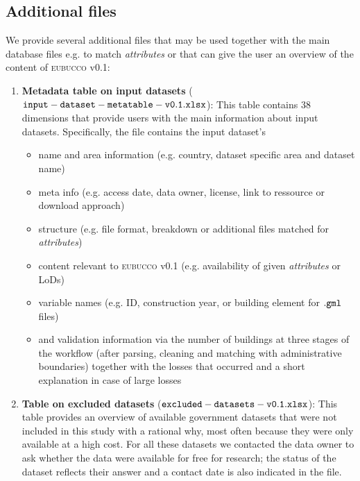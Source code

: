 \documentclass[fleqn,10pt]{wlscirep}
\begin{document}
\subsection*{Additional files}
We provide several additional files that may be used together with the main database files e.g. to match \textit{attributes} or that can give the user an overview of the content of \textsc{eubucco} v0.1: 


\begin{enumerate}[topsep=1pt]

     \itemsep-0.05em 
    
    \item \textbf{Metadata table on input datasets} (${\tt input-dataset-metatable-v0.1.xlsx}$): This table contains 38 dimensions that provide users with the main information about input datasets. Specifically, the file contains the input dataset's
    
    \begin{itemize}[topsep=1pt]
        \itemsep-0.05em  
        \item name and area information (e.g. country, dataset specific area and dataset name)
        \item meta info (e.g. access date, data owner, license, link to ressource or download approach)
        \item structure (e.g. file format, breakdown or additional files matched for \textit{attributes})
        \item content relevant to \textsc{eubucco} v0.1 (e.g. availability of given \textit{attributes} or LoDs)
        \item variable names (e.g. ID, construction year, or building element for ${\tt .gml}$ files)
        \item and validation information via the number of buildings at three stages of the workflow (after parsing, cleaning and matching with administrative boundaries) together with the losses that occurred and a short explanation in case of large losses
    \end{itemize}

    \item \textbf{Table on excluded datasets} (${\tt excluded-datasets-v0.1.xlsx}$): This table provides an overview of available government datasets that were not included in this study with a rational why, most often because they were only available at a high cost. For all these datasets we contacted the data owner to ask whether the data were available for free for research; the status of the dataset reflects their answer and a contact date is also indicated in the file.  
    

\end{enumerate}
\end{document}
